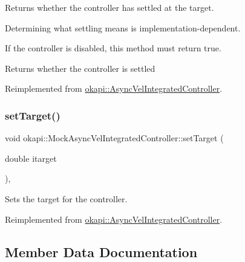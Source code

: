 Returns whether the controller has settled at the target. 

Determining what settling means is implementation-\/dependent.

If the controller is disabled, this method must return true.

\begin{DoxyReturn}{Returns}
whether the controller is settled 
\end{DoxyReturn}


Reimplemented from \mbox{\hyperlink{classokapi_1_1AsyncVelIntegratedController_a8518d706827ccc8d42d0a401566d58f7}{okapi\+::\+Async\+Vel\+Integrated\+Controller}}.

\mbox{\label{classokapi_1_1MockAsyncVelIntegratedController_a9013a295a5a5fca3bbf831932c16f90a}} 
\subsubsection{\texorpdfstring{setTarget()}{setTarget()}}
{\footnotesize\ttfamily void okapi\+::\+Mock\+Async\+Vel\+Integrated\+Controller\+::set\+Target (\begin{DoxyParamCaption}\item[{double}]{itarget }\end{DoxyParamCaption})\hspace{0.3cm}{\ttfamily [override]}, {\ttfamily [virtual]}}



Sets the target for the controller. 



Reimplemented from \mbox{\hyperlink{classokapi_1_1AsyncVelIntegratedController_a5f1444ba57a64a21bfbdbdc57a264c2d}{okapi\+::\+Async\+Vel\+Integrated\+Controller}}.



\subsection{Member Data Documentation}
\mbox{\label{classokapi_1_1MockAsyncVelIntegratedController_a8fb0faaecc38a8d44539522d12960498}} 

